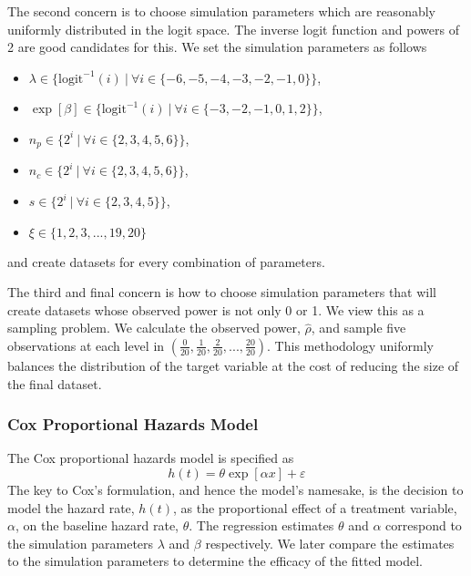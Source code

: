 The second concern is to choose simulation parameters which are reasonably uniformly distributed in the logit space. The inverse logit function and powers of 2 are good candidates for this. We set the simulation parameters as follows 
%
\begin{itemize}
    \item $\lambda \in \lbrace \text{logit}^{-1}(i) ~|~ \forall i \in \lbrace -6, -5, -4, -3, -2, -1, 0 \rbrace \rbrace$,
    \item $\exp[\beta] \in \lbrace \text{logit}^{-1}(i) ~|~ \forall i \in \lbrace -3, -2, -1, 0, 1, 2 \rbrace \rbrace$,
    \item $n_p \in \lbrace 2^i ~|~ \forall i \in \lbrace 2, 3, 4, 5, 6 \rbrace \rbrace$, 
    \item $n_c \in \lbrace 2^i ~|~ \forall i \in \lbrace 2, 3, 4, 5, 6 \rbrace \rbrace$, 
    \item $s \in \lbrace 2^i ~|~ \forall i \in \lbrace 2, 3, 4, 5 \rbrace \rbrace$,
    \item $\xi \in \lbrace 1, 2, 3, ..., 19, 20 \rbrace$
\end{itemize}
%
and create datasets for every combination of parameters.

The third and final concern is how to choose simulation parameters that will create datasets whose observed power is not only 0 or 1. We view this as a sampling problem. We calculate the observed power, $\hat \rho$, and sample five observations at each level in $(\frac{0}{20}, \frac{1}{20}, \frac{2}{20}, ..., \frac{20}{20})$. This methodology uniformly balances the distribution of the target variable at the cost of reducing the size of the final dataset.

\subsubsection{Cox Proportional Hazards Model}

The Cox proportional hazards model is specified as 
%
$$
\label{eq:cox}
    h(t) = \theta \exp \left[ \alpha x \right] + \varepsilon
$$
%
The key to Cox's formulation, and hence the model's namesake, is the decision to model the hazard rate, $h(t)$, as the proportional effect of a treatment variable, $\alpha$, on the baseline hazard rate, $\theta$. The regression estimates $\theta$ and $\alpha$ correspond to the simulation parameters $\lambda$ and $\beta$ respectively. We later compare the estimates to the simulation parameters to determine the efficacy of the fitted model.


